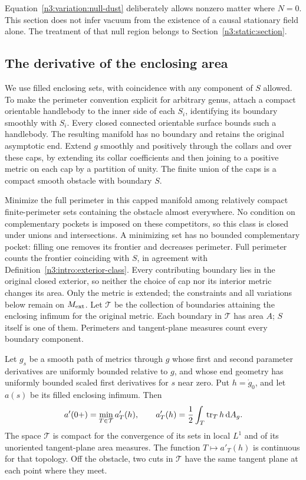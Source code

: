 Equation~\eqref{n3:variation:null-dust} deliberately allows nonzero
matter where $N=0$.  This section does not infer vacuum from the
existence of a causal stationary field alone.  The treatment of that
null region belongs to Section~\ref{n3:static:section}.

\subsection{The derivative of the enclosing area}
\label{n3:variation:area-subsection}

We use filled enclosing sets, with coincidence with any component
of $S$ allowed.  To make the perimeter convention explicit for arbitrary
genus, attach a compact orientable handlebody to the inner side of each
$S_i$, identifying its boundary smoothly with $S_i$.  Every closed
connected orientable surface bounds such a handlebody.  The resulting
manifold has no boundary and retains the original asymptotic end.
Extend $g$ smoothly and positively through the collars and over these
caps, by extending its collar coefficients and then joining to a
positive metric on each cap by a partition of unity.  The finite union
of the caps is a compact smooth obstacle with boundary $S$.

Minimize the full perimeter in this capped manifold among relatively
compact finite-perimeter sets containing the obstacle almost everywhere.
No condition on complementary pockets is imposed on these competitors,
so this class is closed under unions and intersections.  A minimizing
set has no bounded complementary pocket: filling one removes its frontier
and decreases perimeter.  Full perimeter counts the frontier coinciding
with $S$, in agreement with Definition~\ref{n3:intro:exterior-class}.
Every contributing boundary lies
in the original closed exterior, so neither the choice of cap nor its
interior metric changes its area.  Only the metric is extended; the
constraints and all variations below remain on $M_{\mathrm{ext}}$.
Let $\mathcal T$ be the collection of boundaries attaining the enclosing
infimum for the original metric.  Each boundary in $\mathcal T$ has
area $A$; $S$ itself is one of them.  Perimeters and tangent-plane
measures count every boundary component.

\begin{lemma}
\label{n3:variation:area-envelope}
Let $g_s$ be a smooth path of metrics through $g$ whose first and
second parameter derivatives are uniformly bounded relative to $g$,
and whose end geometry has uniformly bounded scaled first derivatives
for $s$ near zero.  Put $h=\dot g_0$, and let $a(s)$ be its filled
enclosing infimum.  Then
\begin{equation}
 a'(0+)=\min_{T\in\mathcal T} a'_T(h),\qquad
 a'_T(h)=\frac12\int_T\operatorname{tr}_T h\,\mathrm d A_g.
 \label{n3:variation:area-envelope-formula}
\end{equation}
The space $\mathcal T$ is compact for the convergence of its sets in
local $L^1$ and of its unoriented tangent-plane area measures.  The
function $T\mapsto a'_T(h)$ is continuous for that topology.
Off the obstacle, two cuts in $\mathcal T$ have the same tangent
plane at each point where they meet.
\end{lemma}

